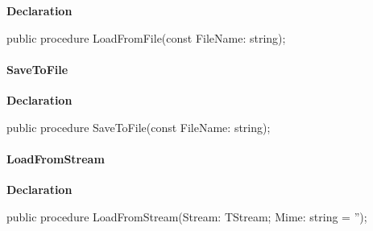 \documentclass{report}
\newif\ifpdf
\begin{document}
\label{opbitmapformats.TOPPicture-LoadFromFile}
\begin{list}{}{
\setlength{\itemindent}{0cm}
\setlength{\listparindent}{0cm}
\setlength{\leftmargin}{\evensidemargin}
\addtolength{\leftmargin}{\tmplength}
\settowidth{\labelsep}{X}
\addtolength{\leftmargin}{\labelsep}
\setlength{\labelwidth}{\tmplength}
}
\item[\textbf{Declaration}\hfill]
\ifpdf
\begin{flushleft}
\fi
\begin{ttfamily}
public procedure LoadFromFile(const FileName: string);\end{ttfamily}

\ifpdf
\end{flushleft}
\fi

\end{list}
\paragraph*{SaveToFile}\hspace*{\fill}

\label{opbitmapformats.TOPPicture-SaveToFile}
\begin{list}{}{
\setlength{\itemindent}{0cm}
\setlength{\listparindent}{0cm}
\setlength{\leftmargin}{\evensidemargin}
\addtolength{\leftmargin}{\tmplength}
\settowidth{\labelsep}{X}
\addtolength{\leftmargin}{\labelsep}
\setlength{\labelwidth}{\tmplength}
}
\item[\textbf{Declaration}\hfill]
\ifpdf
\begin{flushleft}
\fi
\begin{ttfamily}
public procedure SaveToFile(const FileName: string);\end{ttfamily}

\ifpdf
\end{flushleft}
\fi

\end{list}
\paragraph*{LoadFromStream}\hspace*{\fill}

\label{opbitmapformats.TOPPicture-LoadFromStream}
\begin{list}{}{
\setlength{\itemindent}{0cm}
\setlength{\listparindent}{0cm}
\setlength{\leftmargin}{\evensidemargin}
\addtolength{\leftmargin}{\tmplength}
\settowidth{\labelsep}{X}
\addtolength{\leftmargin}{\labelsep}
\setlength{\labelwidth}{\tmplength}
}
\item[\textbf{Declaration}\hfill]
\ifpdf
\begin{flushleft}
\fi
\begin{ttfamily}
public procedure LoadFromStream(Stream: TStream; Mime: string = '');\end{ttfamily}

\ifpdf
\end{flushleft}
\fi

\end{list}
\end{document}
